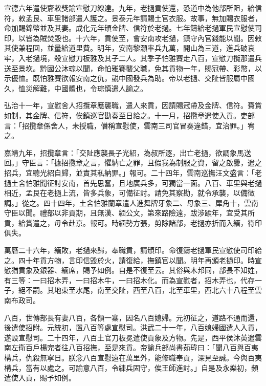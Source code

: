 \begin{pinyinscope}
宣德六年遣使齎敕獎諭宣慰刀線達。九年，老撾貢使還，恐道中為他部所阻，給信符，敕孟艮、車里諸部遣人護之。景泰元年請賜土官衣服。故事，無加賜衣服者，命加賜錦幣並及其妻。成化元年頒金牌、信符於老撾。七年鑄給老撾軍民宣慰使司印，以皆為賊焚毀也。十六年，貢使至，會安南攻老撾，鎮守內官錢能以聞。因敕其使兼程回，並量給道里費。明年，安南黎灝率兵九萬，開山為三道，進兵破哀牢，入老撾境，殺宣慰刀板雅及其子二人。其季子怕雅賽走八百，宣慰刀攬那遣兵送至景坎。黔國公沐琮以聞，命怕雅賽襲父職，免其貢物一年，賜冠帶、彩幣，以示優恤。既怕雅賽欲報安南之仇，覬中國發兵為助。帝以老撾、交阯皆服屬中國久，恤災解難，中國體也，令琮慎遣人諭之。

弘治十一年，宣慰舍人招攬章應襲職，遣人來貢，因請賜冠帶及金牌、信符。賚賞如制，其金牌、信符，俟鎮巡官勘奏至日給之。十一月，招攬章遣使入貢。吏部言：「招攬章係舍人，未授職，僭稱宣慰使，雲南三司官冒奏違錯，宜治罪。」宥之。

嘉靖九年，招攬章言：「交阯應襲長子光紹，為叔所逐，出亡老撾，欲調象馬送回。」守臣言：「據招攬章之言，懼納亡之罪，且假我為制服之資，留之啟釁，遣之招兵，宜聽光紹自歸，並責其私納罪。」報可。二十四年，雲南巡撫汪文盛言：「老撾土舍怕雅聞征討安南，首先思奮，且地廣兵多，可獨當一面。八百、車里與老撾相近，孟艮在老撾上流，皆多兵象，可備征討。請免其察勘，就令承襲，以備徵調。」從之。四十四年，土舍怕雅蘭章遣人進舞牌牙象二、母象三、犀角十，雲南守臣以聞。禮部以非貢期，且無漢、緬公文，第來路險遠，跋涉踰年，宜受其所貢，給賞遣之，毋令赴京。報可。時緬勢方張，剪除諸部，老撾亦折而入緬，符印俱失。

萬曆二十六年，緬敗，老撾來歸，奉職貢，請頒印。命復鑄老撾軍民宣慰使司印給之。四十年貢方物，言印信毀於火，請復給，撫鎮官以聞。明年再頒老撾印。時宣慰猶貢象及銀器、緬席，賜予如例。自是不復至云。其俗與木邦同，部長不知姓，有三等：一曰招木弄，一曰招木牛，一曰招木化。而為宣慰者，招木弄也，代存一子，絕不嗣。其地東至水尾，南至交阯，西至八百，北至車里，西北六十八程至雲南布政司。

八百，世傳部長有妻八百，各領一寨，因名八百媳婦。元初征之，道路不通而還，後遣使招附。元統初，置八百等處宣慰司。洪武二十一年，八百媳婦國遣人入貢，遂設宣慰司。二十四年，八百土官刀板冕遣使貢象及方物。先是，西平侯沐英遣雲南左衛百戶楊完者往八百招撫，至是來貢。帝諭兵部尚書茹瑋曰：「聞八百與百夷構兵，仇殺無寧日。朕念八百宣慰遠在萬里外，能修職奉貢，深見至誠。今與百夷構兵，當有以處之。可諭意八百，令練兵固守，俟王師進討。」自是及永樂初，頻遣使入貢，賜予如例。


\end{pinyinscope}
